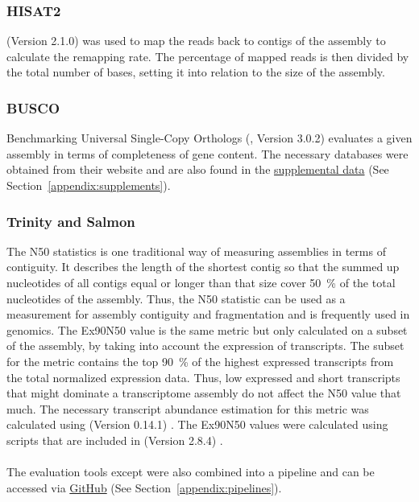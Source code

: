 \documentclass[12pt,a4paper,english]{article}
\begin{document}
\subsubsection*{HISAT2}
	\hisat (Version 2.1.0) \citep{hisat2:15} was used to map the reads back to contigs of the assembly to calculate the remapping rate. The percentage of mapped reads is then divided by the total number of bases, setting it into relation to the size of the assembly.
	
\subsubsection*{BUSCO}
	Benchmarking Universal Single-Copy Orthologs (\busco, Version 3.0.2) \citep{busco:15,busco:18} evaluates a given assembly in terms of completeness of gene content. The necessary databases were obtained from their website and are also found in the \href{https://github.com/lmfaber/master_thesis/blob/master/supplemental_data/busco_databases.txt}{supplemental data} (See Section~\ref{appendix:supplements}).
	\vfill

\subsubsection*{Trinity and Salmon}
    The N50 statistics is one traditional way of measuring assemblies in terms of contiguity. 
	It describes the length of the shortest contig so that the summed up nucleotides of all contigs equal or longer than that size cover 50~\% of the total nucleotides of the assembly. Thus, the N50 statistic can be used as a measurement for assembly contiguity and fragmentation and is frequently used in genomics.
	The Ex90N50 value is the same metric but only calculated on a subset of the assembly, by taking into account the expression of transcripts. The subset for the metric contains the top 90~\% of the highest expressed transcripts from the total normalized expression data. 
	Thus, low expressed and short transcripts that might dominate a transcriptome assembly do not affect the N50 value that much.
	The necessary transcript abundance estimation for this metric was calculated using \salmon (Version 0.14.1) \citep{salmon:17}. The Ex90N50 values were calculated using scripts that are included in \trinity (Version 2.8.4) \citep{Trinity:11}.
	\\
	\\
	The evaluation tools except \blast were also combined into a \snakemake pipeline and can be accessed via \href{https://github.com/lmfaber/evaluation}{GitHub} (See Section~\ref{appendix:pipelines}).
	
\end{document}
